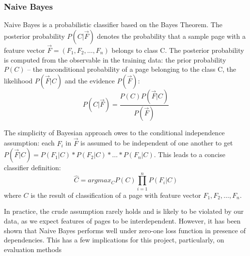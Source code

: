 \documentclass[12pt,twoside,notitlepage]{report}
\begin{document}
\subsubsection*{Naive Bayes}

Naive Bayes is a probabilistic classifier based on the Bayes Theorem. The
posterior probability \(P(C|\vec{F})\) denotes the probability that a sample
page with a feature vector \(\vec{F}=(F_1,F_2,\dots,F_n)\) belongs to class C.
The posterior probability is computed from the observable in the training data: the prior
probability \(P(C)\) -- the unconditional probability of a page belonging to
the class C, the likelihood \(P(\vec{F}|C)\) and the evidence \(P(\vec{F})\):
\begin{equation}
P(C|\vec{F}) = \frac{P(C)P(\vec{F}|C)}{P(\vec{F})}
\end{equation}

The simplicity of Bayesian approach owes to the conditional independence
assumption: each \(F_i\) in \(\vec{F}\) is assumed to be independent of one
another to get \(P(\vec{F}|C)=P(F_1|C)*P(F_2|C)*\dots*P(F_n|C)\). This leads to a concise classifier definition:
\begin{equation}
\hat{C}= argmax_C P(C)\prod_{i=1}^{n}P(F_i|C)
\end{equation}
where \(C\) is the result of classification of a page with feature vector
\(F_1,F_2,\dots,F_n\).

In practice, the crude assumption rarely  holds and is likely to
be violated by our data, as we expect features of pages to be interdependent.
However, it has been shown that Naive Bayes performs well under zero-one loss
function in presence of dependencies\cite{OPTIM}. This has a few
implications for this project, particularly, on evaluation methods 
\end{document}
